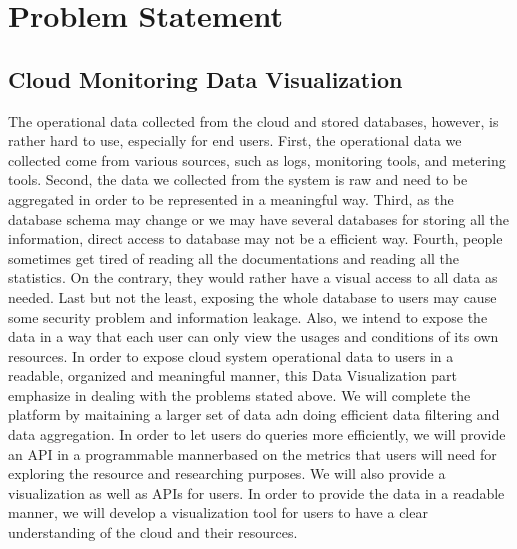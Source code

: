 \section{Problem Statement}
\label{sec:ProblemStatement}



  \subsection{Cloud Monitoring Data Visualization}
  The operational data collected from the cloud and stored databases, however, is rather hard to use, especially for end users. First, the operational data we collected come from various sources, such as logs, monitoring tools, and metering tools. Second, the data we collected from the system is raw and need to be aggregated in order to be represented in a meaningful way. Third, as the database schema may change or we may have several databases for storing all the information, direct access to database may not be a efficient way. Fourth, people sometimes get tired of reading all the documentations and reading all the statistics. On the contrary, they would rather have a visual access to all data as needed. Last but not the least, exposing the whole database to users may cause some security problem and information leakage. Also, we intend to expose the data in a way that each user can only view the usages and conditions of its own resources.  
  In order to expose cloud system operational data to users in a readable, organized and meaningful manner, this Data Visualization part emphasize in dealing with the problems stated above. We will complete the platform by  maitaining a larger set of data adn doing efficient data filtering and data aggregation. In order to let users do queries more efficiently, we will provide an API in a programmable mannerbased on the metrics that users will need for exploring the resource and researching purposes. We will also provide a visualization as well as APIs for users. In order to provide the data in a readable manner, we will develop a visualization tool for users to have a clear understanding of the cloud and their resources. 